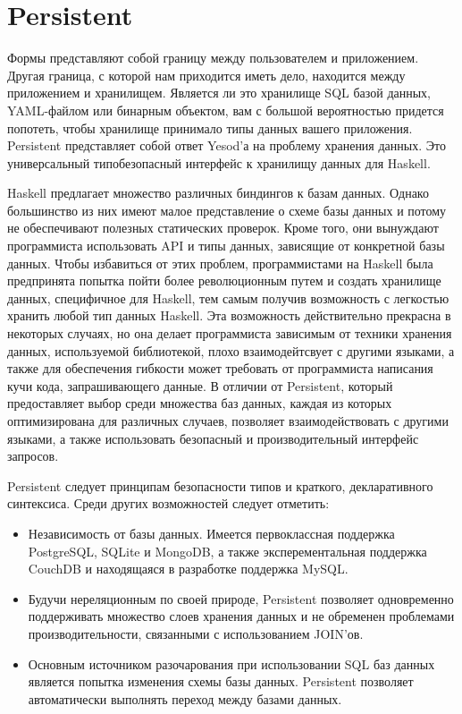 \chapter{Persistent}\label{chap:persistent}


Формы представляют собой границу между пользователем и приложением. Другая граница, с которой нам приходится иметь дело, находится между приложением и хранилищем. Является ли это хранилище SQL базой данных, YAML-файлом или бинарным объектом, вам с большой вероятностью придется попотеть, чтобы хранилище принимало типы данных вашего приложения. Persistent представляет собой ответ Yesod'а на проблему хранения данных. Это универсальный типобезопасный интерфейс к хранилищу данных для Haskell.

Haskell предлагает множество различных биндингов к базам данных. Однако большинство из них имеют малое представление о схеме базы данных и потому не обеспечивают полезных статических проверок. Кроме того, они вынуждают программиста использовать API и типы данных, зависящие от конкретной базы данных. Чтобы избавиться от этих проблем, программистами на Haskell была предпринята попытка пойти более революционным путем и создать хранилище данных, специфичное для Haskell, тем самым получив возможность с легкостью хранить любой тип данных Haskell. Эта возможность действительно прекрасна в некоторых случаях, но она делает программиста зависимым от техники хранения данных, используемой библиотекой, плохо взаимодейтсвует с другими языками, а также для обеспечения гибкости может требовать от программиста написания кучи кода, запрашивающего данные. В отличии от Persistent, который предоставляет выбор среди множества баз данных, каждая из которых оптимизирована для различных случаев, позволяет взаимодействовать с другими языками, а также использовать безопасный и производительный интерфейс запросов.

Persistent следует принципам безопасности типов и краткого, декларативного синтексиса. Среди других возможностей следует отметить:

\begin{itemize}
  \item Независимость от базы данных. Имеется первоклассная поддержка PostgreSQL, SQLite и MongoDB, а также эксперементальная поддержка CouchDB и находящаяся в разработке поддержка MySQL.
  \item Будучи нереляционным по своей природе, Persistent позволяет одновременно поддерживать множество слоев хранения данных и не обременен проблемами производительности, связанными с использованием JOIN'ов.
  \item Основным источником разочарования при использовании SQL баз данных является попытка изменения схемы базы данных. Persistent позволяет автоматически выполнять переход между базами данных. %
\end{itemize}

